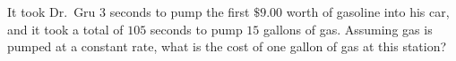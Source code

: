 It took Dr.~Gru $3$ seconds to pump the first $\$9.00$ worth of gasoline into his car, and it took a total of $105$ seconds to pump $15$ gallons of gas. Assuming gas is pumped at a constant rate, what is the cost of one gallon of gas at this station?
